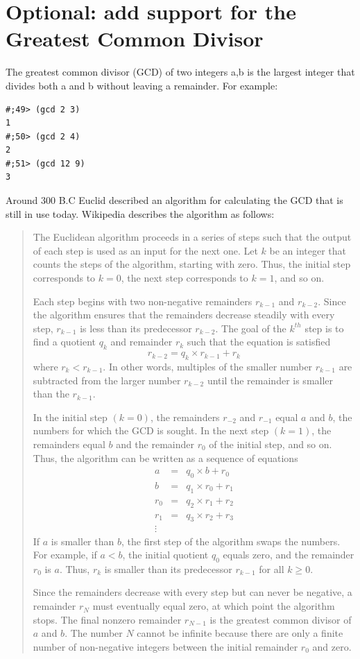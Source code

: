 \documentclass[12pt,a4paper,english,twoside]{article}
\begin{document}
\section{Optional: add support for the Greatest Common Divisor}
The greatest common divisor (GCD) of two integers a,b is the largest integer that 
divides both a and b without leaving a remainder. For example: 
\begin{lstlisting}
#;49> (gcd 2 3)
1
#;50> (gcd 2 4)
2
#;51> (gcd 12 9)
3
\end{lstlisting}
Around 300 B.C Euclid described an algorithm for calculating the GCD that is 
still in use today. Wikipedia \cite{euclid} describes the algorithm  as follows:
\begin{quote}
 The Euclidean algorithm proceeds in a series of steps such that the output of 
 each step is used as an input for the next one. Let $k$ be an integer that 
 counts the steps of the algorithm, starting with zero. Thus, the initial step 
 corresponds to $k = 0$, the next step corresponds to $k = 1$, and so on.

 Each step begins with two non-negative remainders $r_{k-1}$ and $r_{k-2}$. Since 
 the algorithm ensures that the remainders decrease steadily with every step, 
 $r_{k-1}$ is less than its predecessor $r_{k-2}$. The goal of the $k^{th}$ step is to find a 
 quotient $q_{k}$ and remainder $r_{k}$ such that the equation is satisfied
 \begin{equation*}
   r_{k-2} = q_{k} \times r_{k-1} + r_{k}
\end{equation*}
where $r_{k} < r_{k-1}$. In other words, multiples of the smaller number 
$r_{k-1}$ are subtracted from the larger number $r_{k-2}$ until the remainder 
is smaller than the $r_{k-1}$.

In the initial step $(k = 0)$, the remainders $r_{-2}$ and $r_{-1}$ equal $a$ and $b$, the 
numbers for which the GCD is sought. In the next step $(k = 1)$, the remainders 
equal $b$ and the remainder $r_{0}$ of the initial step, and so on. Thus, the 
algorithm can be written as a sequence of equations
\begin{eqnarray*}
  a &=& q_{0} \times b + r_{0} \\
  b &=& q_{1} \times r_{0} + r_{1} \\
  r_{0} &=& q_{2} \times  r_{1} + r_{2} \\
  r_{1} &=& q_{3} \times r_{2} + r_{3} \\
\vdots
\end{eqnarray*}
If $a$ is smaller than $b$, the first step of the algorithm swaps the numbers. For 
example, if $a < b$, the initial quotient $q_{0}$ equals zero, and the remainder $r_{0}$ 
is $a$. Thus, $r_{k}$ is smaller than its predecessor $r_{k-1}$ for all $k \geq 0$.

Since the remainders decrease with every step but can never be negative, a 
remainder $r_{N}$ must eventually equal zero, at which point the algorithm 
stops. The final nonzero remainder $r_{N-1}$ is the greatest common divisor of 
$a$ and $b$. The number $N$ cannot be infinite because there are only a finite 
number of non-negative integers between the initial remainder $r_{0}$ and zero. 
\end{quote}
\end{document}
